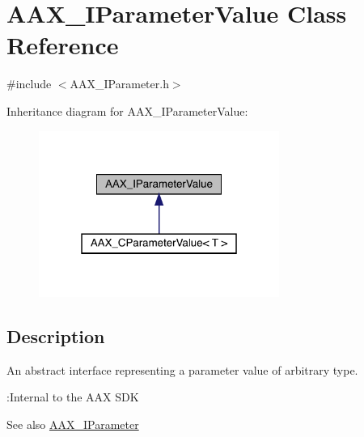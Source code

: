\hypertarget{a01853}{}\section{A\+A\+X\+\_\+\+I\+Parameter\+Value Class Reference}
\label{a01853}


{\ttfamily \#include $<$A\+A\+X\+\_\+\+I\+Parameter.\+h$>$}



Inheritance diagram for A\+A\+X\+\_\+\+I\+Parameter\+Value\+:
\nopagebreak
\begin{figure}[H]
\begin{center}
\leavevmode
\includegraphics[width=223pt]{a01852}
\end{center}
\end{figure}


\subsection{Description}
An abstract interface representing a parameter value of arbitrary type. 

\begin{DoxyRefDesc}{\+:\+Internal to the A\+A\+X S\+DK}
\item[\mbox{\hyperlink{a00792__aax_sdk_internal000001}{\+:\+Internal to the A\+A\+X S\+DK}}]\end{DoxyRefDesc}


\begin{DoxySeeAlso}{See also}
\mbox{\hyperlink{a01857}{A\+A\+X\+\_\+\+I\+Parameter}} 
\end{DoxySeeAlso}
